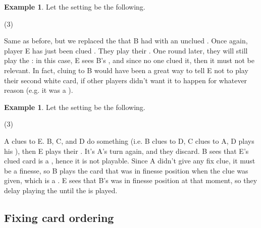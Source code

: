 \documentclass[a4paper]{article}
\theoremstyle{plain}
\theoremstyle{definition}
\newtheorem{example}[theorem]{Example}
\begin{document}
\begin{example}
	
	Let the setting be the following.
	
	\begin{tasks}(3)
		\task[+]      
		\task[A]    
		\task[B]    
		\task[C]    
		\task[D]    
		\task[E]    
	\end{tasks}
	
	Same as before, but we replaced the  that B had with an unclued . Once again, player E has just been clued . They play their . One round later, they will still play the : in this case, E sees B's , and since no one clued it, then it must not be relevant. In fact, cluing  to B would have been a great way to tell E not to play their second white card, if other players didn't want it to happen for whatever reason (e.g. it was a ).
	
\end{example}

\begin{example}
	
	Let the setting be the following.
	
	\begin{tasks}(3)
		\task[+]      
		\task[A]    
		\task[B]    
		\task[C]    
		\task[D]    
		\task[E]    
	\end{tasks}
	
	A clues  to E. B, C, and D do something (i.e. B clues  to D, C clues  to A, D plays his ), then E plays their . It's A's turn again, and they discard. B sees that E's clued card is a , hence it is not playable. Since A didn't give any fix clue, it must be a finesse, so B plays the card that was in finesse position when the  clue was given, which is a . E sees that B's  was in finesse position at that moment, so they delay playing the  until the  is played.
	
\end{example}

\subsection{Fixing card ordering}
\end{document}
